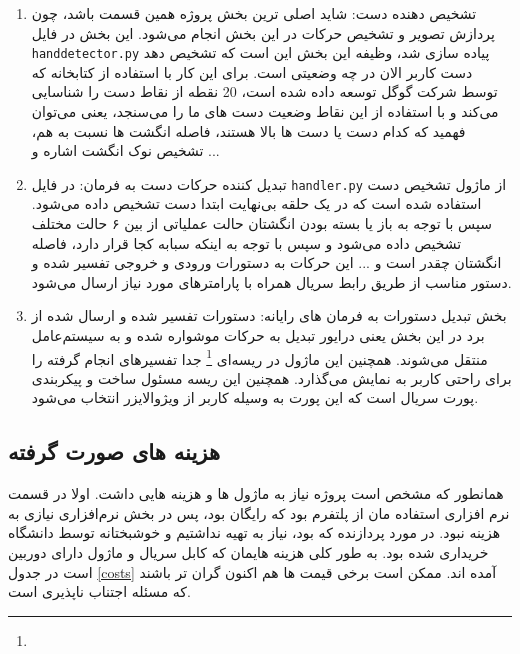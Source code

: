 \documentclass{article}
\begin{document}
\begin{enumerate}
	\item تشخیص دهنده دست: شاید اصلی ترین بخش پروژه همین قسمت باشد، چون پردازش تصویر و تشخیص حرکات در این بخش انجام می‌شود. این بخش در فایل 
	\verb~handdetector.py~
	 پیاده سازی شد، وظیفه این بخش این است که تشخیص دهد دست کاربر الان در چه وضعیتی است. برای این کار با استفاده از کتابخانه  که توسط شرکت گوگل توسعه داده شده است، 20 نقطه از نقاط دست را شناسایی می‌کند و با استفاده از این نقاط وضعیت دست های ما را می‌سنجد، یعنی می‌توان فهمید که کدام دست یا دست ها بالا هستند، فاصله انگشت ها نسبت به هم، تشخیص نوک انگشت اشاره و ...

	 
	 \item تبدیل کننده حرکات دست به فرمان: در فایل
	 \verb!handler.py!
از ماژول تشخیص دست استفاده شده است که در یک حلقه بی‌نهایت ابتدا دست تشخیص داده می‌شود. سپس
با توجه به باز یا بسته بودن انگشتان حالت عملیاتی از بین ۶ حالت مختلف تشخیص داده می‌شود
و سپس با توجه به اینکه سبابه کجا قرار دارد، فاصله انگشتان چقدر است و ... این حرکات به
دستورات ورودی و خروجی تفسیر شده و دستور مناسب از طریق رابط سریال همراه با پارامترهای مورد نیاز ارسال می‌شود.


	 
	 \item بخش تبدیل دستورات به فرمان های  رایانه: دستورات تفسیر شده و ارسال شده از
	 برد در این بخش یعنی درایور تبدیل به حرکات موشواره شده و به سیستم‌عامل منتقل می‌شوند.
	 همچنین این ماژول در ریسه‌ای \footnote{} جدا تفسیر‌های انجام گرفته را برای راحتی کاربر به نمایش می‌گذارد. همچنین این ریسه مسئول ساخت و پیکربندی پورت سریال است که این
	 پورت به وسیله کاربر از ویژوالایزر انتخاب می‌شود.
	 
	 
\end{enumerate}

\subsection{هزینه های صورت گرفته}
همانطور که مشخص است پروژه نیاز به ماژول ها و هزینه هایی داشت. اولا در قسمت نرم افزاری استفاده مان از پلتفرم  بود که رایگان بود، پس در بخش نرم‌افزاری نیازی به هزینه نبود. در مورد پردازنده که  بود، نیاز به تهیه نداشتیم و خوشبختانه توسط دانشگاه خریداری شده بود. به طور کلی هزینه هایمان که کابل سریال و ماژول دارای دوربین است در جدول \ref{costs} آمده اند. ممکن است برخی قیمت ها هم اکنون گران تر باشند که مسئله اجتناب ناپذیری است.
\end{document}
